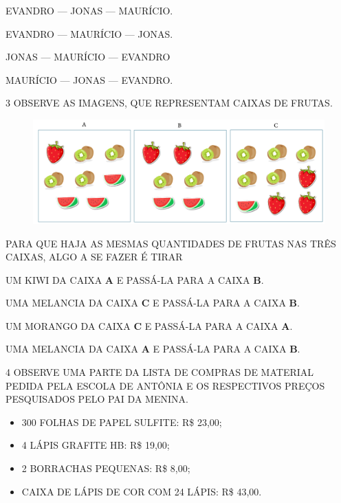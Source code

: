 \begin{escolha}[itemsep=0pt]
\item EVANDRO --- JONAS --- MAURÍCIO.

\item EVANDRO --- MAURÍCIO --- JONAS.

\item JONAS --- MAURÍCIO --- EVANDRO

\item MAURÍCIO --- JONAS --- EVANDRO.
\end{escolha}

\pagebreak
\num{3} OBSERVE AS IMAGENS, QUE REPRESENTAM CAIXAS DE FRUTAS.

\begin{figure}[htpb!]
\centering
\includegraphics[width=\textwidth]{./media/SAEB_1ANO_MAT_FIGURA137.png}
\end{figure}

PARA QUE HAJA AS MESMAS QUANTIDADES DE FRUTAS NAS TRÊS CAIXAS, ALGO
A SE FAZER É TIRAR

\begin{escolha}[itemsep=0pt]
\item UM KIWI DA CAIXA \textbf{A} E PASSÁ-LA PARA A CAIXA \textbf{B}.

\item UMA MELANCIA DA CAIXA \textbf{C} E PASSÁ-LA PARA A CAIXA \textbf{B}.

\item UM MORANGO DA CAIXA \textbf{C} E PASSÁ-LA PARA A CAIXA \textbf{A}.

\item UMA MELANCIA DA CAIXA \textbf{A} E PASSÁ-LA PARA A CAIXA \textbf{B}.
\end{escolha}

\num{4} OBSERVE UMA PARTE DA LISTA DE COMPRAS DE MATERIAL PEDIDA PELA ESCOLA DE ANTÔNIA E OS RESPECTIVOS PREÇOS PESQUISADOS PELO PAI DA MENINA.

\begin{myquote}
\begin{itemize}
  \item 300 FOLHAS DE PAPEL SULFITE: R\$ 23,00;
  \item 4 LÁPIS GRAFITE HB: R\$ 19,00;
  \item 2 BORRACHAS PEQUENAS: R\$ 8,00;
  \item CAIXA DE LÁPIS DE COR COM 24 LÁPIS: R\$ 43,00.
\end{itemize}
\end{myquote}

